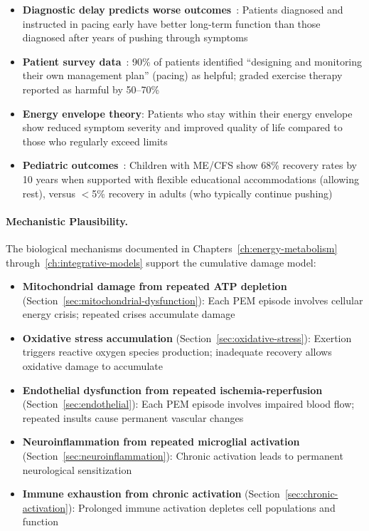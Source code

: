\begin{itemize}
    \item \textbf{Diagnostic delay predicts worse outcomes}~\cite{Lacourt2022prognosis}: Patients diagnosed and instructed in pacing early have better long-term function than those diagnosed after years of pushing through symptoms

    \item \textbf{Patient survey data}~\cite{Chu2019}: 90\% of patients identified ``designing and monitoring their own management plan'' (pacing) as helpful; graded exercise therapy reported as harmful by 50--70\%

    \item \textbf{Energy envelope theory}: Patients who stay within their energy envelope show reduced symptom severity and improved quality of life compared to those who regularly exceed limits

    \item \textbf{Pediatric outcomes}~\cite{Rowe2019pediatric}: Children with ME/CFS show 68\% recovery rates by 10 years when supported with flexible educational accommodations (allowing rest), versus $<$5\% recovery in adults (who typically continue pushing)
\end{itemize}

\paragraph{Mechanistic Plausibility.}

The biological mechanisms documented in Chapters~\ref{ch:energy-metabolism} through~\ref{ch:integrative-models} support the cumulative damage model:

\begin{itemize}
    \item \textbf{Mitochondrial damage from repeated ATP depletion} (Section~\ref{sec:mitochondrial-dysfunction}): Each PEM episode involves cellular energy crisis; repeated crises accumulate damage

    \item \textbf{Oxidative stress accumulation} (Section~\ref{sec:oxidative-stress}): Exertion triggers reactive oxygen species production; inadequate recovery allows oxidative damage to accumulate

    \item \textbf{Endothelial dysfunction from repeated ischemia-reperfusion} (Section~\ref{sec:endothelial}): Each PEM episode involves impaired blood flow; repeated insults cause permanent vascular changes

    \item \textbf{Neuroinflammation from repeated microglial activation} (Section~\ref{sec:neuroinflammation}): Chronic activation leads to permanent neurological sensitization

    \item \textbf{Immune exhaustion from chronic activation} (Section~\ref{sec:chronic-activation}): Prolonged immune activation depletes cell populations and function
\end{itemize}

